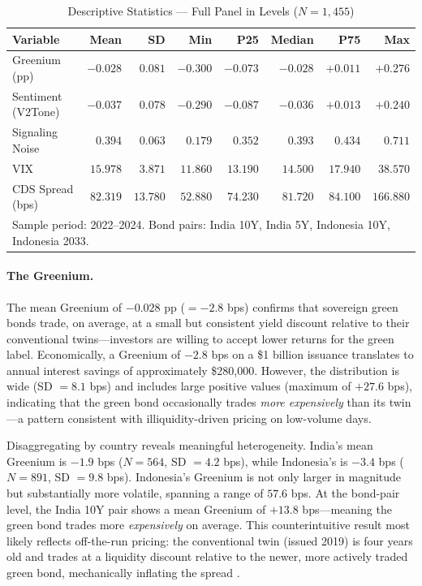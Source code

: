 \documentclass[12pt,a4paper]{article}
\begin{document}
\begin{table}[H]
\centering
\caption{Descriptive Statistics --- Full Panel in Levels ($N = 1{,}455$)}
\label{tab:desc}
\small
\begin{tabular}{lrrrrrrr}
\toprule
\textbf{Variable} & \textbf{Mean} & \textbf{SD} & \textbf{Min} & \textbf{P25} & \textbf{Median} & \textbf{P75} & \textbf{Max} \\
\midrule
Greenium (pp)        & $-0.028$ & $0.081$ & $-0.300$ & $-0.073$ & $-0.028$ & $+0.011$ & $+0.276$ \\
Sentiment (V2Tone)   & $-0.037$ & $0.078$ & $-0.290$ & $-0.087$ & $-0.036$ & $+0.013$ & $+0.240$ \\
Signaling Noise      & $0.394$  & $0.063$ & $0.179$  & $0.352$  & $0.393$  & $0.434$  & $0.711$  \\
VIX                  & $15.978$ & $3.871$ & $11.860$ & $13.190$ & $14.500$ & $17.940$ & $38.570$ \\
CDS Spread (bps)     & $82.319$ & $13.780$ & $52.880$ & $74.230$ & $81.720$ & $84.100$ & $166.880$ \\
\bottomrule
\multicolumn{8}{l}{\footnotesize Sample period: 2022--2024. Bond pairs: India 10Y, India 5Y, Indonesia 10Y, Indonesia 2033.}
\end{tabular}
\end{table}

\paragraph{The Greenium.}
The mean Greenium of $-0.028$ pp ($= -2.8$ bps) confirms that sovereign green bonds trade, on average, at a small but consistent yield discount relative to their conventional twins---investors are willing to accept lower returns for the green label. Economically, a Greenium of $-2.8$ bps on a \$1 billion issuance translates to annual interest savings of approximately \$280,000. However, the distribution is wide (SD $= 8.1$ bps) and includes large positive values (maximum of $+27.6$ bps), indicating that the green bond occasionally trades \textit{more expensively} than its twin---a pattern consistent with illiquidity-driven pricing on low-volume days.

Disaggregating by country reveals meaningful heterogeneity. India's mean Greenium is $-1.9$ bps ($N = 564$, SD $= 4.2$ bps), while Indonesia's is $-3.4$ bps ($N = 891$, SD $= 9.8$ bps). Indonesia's Greenium is not only larger in magnitude but substantially more volatile, spanning a range of $57.6$ bps. At the bond-pair level, the India 10Y pair shows a mean Greenium of $+13.8$ bps---meaning the green bond trades more \textit{expensively} on average. This counterintuitive result most likely reflects off-the-run pricing: the conventional twin (issued 2019) is four years old and trades at a liquidity discount relative to the newer, more actively traded green bond, mechanically inflating the spread \citep{Zerbib2019}.
\end{document}
